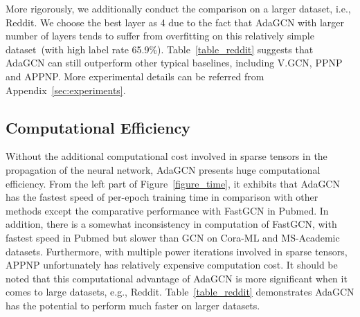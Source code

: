 \documentclass{article} \usepackage{iclr2021_conference,times}
\begin{document}
More rigorously, we additionally conduct the comparison on a larger dataset, i.e., Reddit. We choose the best layer as 4 due to the fact that AdaGCN with larger number of layers tends to suffer from overfitting on this relatively simple dataset~(with high label rate 65.9\%). Table~\ref{table_reddit} suggests that AdaGCN can still outperform other typical baselines, including V.GCN, PPNP and APPNP. More experimental details can be referred from Appendix~\ref{sec:experiments}.

\subsection{Computational Efficiency} \label{sec:experiment_computation}

Without the additional computational cost involved in sparse tensors in the propagation of the neural network, AdaGCN presents huge computational efficiency. From the left part of Figure~\ref{figure_time}, it exhibits that AdaGCN has the fastest speed of per-epoch training time in comparison with other methods except the comparative performance with FastGCN in Pubmed. In addition, there is a somewhat inconsistency in computation of FastGCN, with fastest speed in Pubmed but slower than GCN on Cora-ML and MS-Academic datasets. Furthermore, with multiple power iterations involved in sparse tensors, APPNP unfortunately has relatively expensive computation cost. It should be noted that this computational advantage of AdaGCN is more significant when it comes to large datasets, e.g., Reddit. Table~\ref{table_reddit} demonstrates AdaGCN has the potential to perform much faster on larger datasets.
\end{document}
